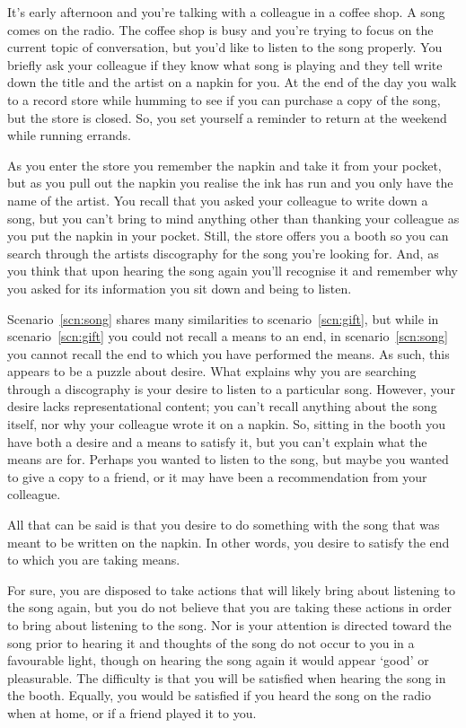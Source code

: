 \documentclass[10pt]{article}
\begin{document}
\begin{scenario}\label{scn:song}
  It's early afternoon and you're talking with a colleague in a coffee shop.
  A song comes on the radio.
  The coffee shop is busy and you're trying to focus on the current topic of conversation, but you'd like to listen to the song properly.
  You briefly ask your colleague if they know what song is playing and they tell write down the title and the artist on a napkin for you.
  At the end of the day you walk to a record store while humming to see if you can purchase a copy of the song, but the store is closed.
  So, you set yourself a reminder to return at the weekend while running errands.

  As you enter the store you remember the napkin and take it from your pocket, but as you pull out the napkin you realise the ink has run and you only have the name of the artist.
  You recall that you asked your colleague to write down a song, but you can't bring to mind anything other than thanking your colleague as you put the napkin in your pocket.
  Still, the store offers you a booth so you can search through the artists discography for the song you're looking for.
  And, as you think that upon hearing the song again you'll recognise it and remember why you asked for its information you sit down and being to listen.
\end{scenario}

Scenario~\ref{scn:song} shares many similarities to scenario~\ref{scn:gift}, but while in scenario~\ref{scn:gift} you could not recall a means to an end, in scenario~\ref{scn:song} you cannot recall the end to which you have performed the means.
As such, this appears to be a puzzle about desire.
What explains why you are searching through a discography is your desire to listen to a particular song.
However, your desire lacks representational content; you can't recall anything about the song itself, nor why your colleague wrote it on a napkin.
So, sitting in the booth you have both a desire and a means to satisfy it, but you can't explain what the means are for.
Perhaps you wanted to listen to the song, but maybe you wanted to give a copy to a friend, or it may have been a recommendation from your colleague.

All that can be said is that you desire to do something with the song that was meant to be written on the napkin.
In other words, you desire to satisfy the end to which you are taking means.

For sure, you are disposed to take actions that will likely bring about listening to the song again, but you do not believe that you are taking these actions in order to bring about listening to the song.
Nor is your attention is directed toward the song prior to hearing it and thoughts of the song do not occur to you in a favourable light, though on hearing the song again it would appear `good' or pleasurable.
The difficulty is that you will be satisfied when hearing the song in the booth.
Equally, you would be satisfied if you heard the song on the radio when at home, or if a friend played it to you.
\end{document}
